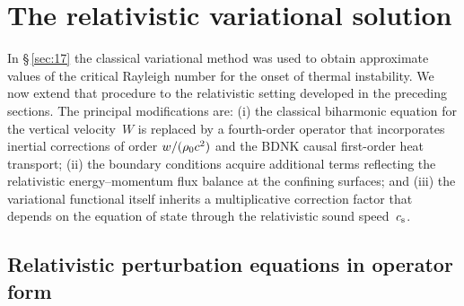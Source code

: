 %
%

\section{The relativistic variational solution}\label{sec:rel-17}

In \S\,\ref{sec:17} the classical variational method was used to obtain
approximate values of the critical Rayleigh number for the onset of
thermal instability.  We now extend that procedure to the relativistic
setting developed in the preceding sections.  The principal
modifications are: (i) the classical biharmonic equation for the
vertical velocity~$W$ is replaced by a fourth-order operator that
incorporates inertial corrections of order $w/(\rho_0 c^{2})$
and the BDNK causal first-order heat transport;
(ii) the boundary conditions acquire additional terms reflecting the
relativistic energy--momentum flux balance at the confining surfaces;
and (iii) the variational functional itself inherits a multiplicative
correction factor that depends on the equation of state through the
relativistic sound speed~$c_{\mathrm{s}}$.

\subsection{Relativistic perturbation equations in operator form}

